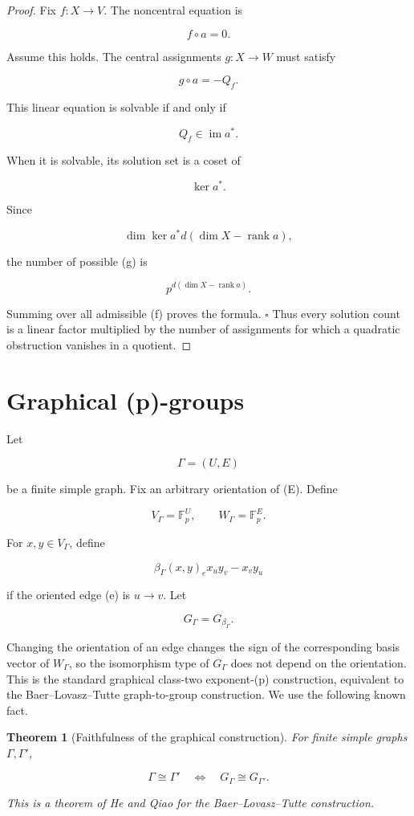 \documentclass[11pt]{article}
\newtheorem{theorem}{Theorem}[section]
\begin{document}
\begin{proof}
Fix $f:X\to V$. The noncentral equation is

\[
f\circ a=0.
\]

Assume this holds. The central assignments $g:X\to W$ must satisfy

\[
g\circ a=-Q_f.
\]

This linear equation is solvable if and only if

\[
Q_f\in\operatorname{im}a^*.
\]

When it is solvable, its solution set is a coset of

\[
\ker a^*.
\]

Since

\[
\dim\ker a^*
d(\dim X-\operatorname{rank}a),
\]

the number of possible (g) is

\[
p^{d(\dim X-\operatorname{rank}a)}.
\]

Summing over all admissible (f) proves the formula. $\square$ Thus every solution count is a linear factor multiplied by the number of assignments for which a quadratic obstruction vanishes in a quotient.

\end{proof}

\section{Graphical (p)-groups}

Let

\[
\Gamma=(U,E)
\]

be a finite simple graph. Fix an arbitrary orientation of (E). Define

\[
V_\Gamma=\mathbb F_p^U,
\qquad
W_\Gamma=\mathbb F_p^E.
\]

For $x,y\in V_\Gamma$, define

\[
\beta_\Gamma(x,y)_e
x_u y_v-x_v y_u
\]

if the oriented edge (e) is $u\to v$. Let

\[
G_\Gamma=G_{\beta_\Gamma}.
\]

Changing the orientation of an edge changes the sign of the corresponding basis vector of $W_\Gamma$, so the isomorphism type of $G_\Gamma$ does not depend on the orientation. This is the standard graphical class-two exponent-(p) construction, equivalent to the Baer--Lovasz--Tutte graph-to-group construction. We use the following known fact.

\begin{theorem}[Faithfulness of the graphical construction]
For finite simple graphs $\Gamma,\Gamma'$,

\[
\Gamma\cong\Gamma'
\quad\Longleftrightarrow\quad
G_\Gamma\cong G_{\Gamma'}.
\]

This is a theorem of He and Qiao for the Baer--Lovasz--Tutte construction.

\end{theorem}
\end{document}
